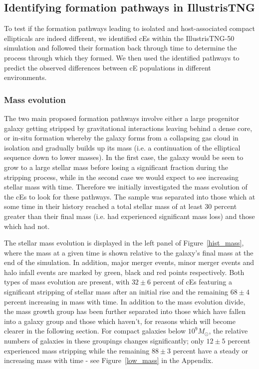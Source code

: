 \documentclass[a4paper,fleqn,usenatbib]{mnras}
\begin{document}
\subsection{Identifying formation pathways in IllustrisTNG}

To test if the formation pathways leading to isolated and host-associated compact ellipticals are indeed different, we identified cEs within the IllustrisTNG-50 simulation and followed their formation back through time to determine the process through which they formed. We then used the identified pathways to predict the observed differences between cE populations in different environments. 


\subsubsection{Mass evolution}

The two main proposed formation pathways involve either a large progenitor galaxy getting stripped by gravitational interactions leaving behind a dense core, or in-situ formation whereby the galaxy forms from a collapsing gas cloud in isolation and gradually builds up its mass (i.e. a continuation of the elliptical sequence down to lower masses). In the first case, the galaxy would be seen to grow to a large stellar mass before losing a significant fraction during the stripping process, while in the second case we would expect to see increasing stellar mass with time. Therefore we initially investigated the mass evolution of the cEs to look for these pathways. The sample was separated into those which at some time in their history reached a total stellar mass of at least 30 percent greater than their final mass (i.e. had experienced significant mass loss) and those which had not. 

The stellar mass evolution is displayed in the left panel of Figure~\ref{hist_mass}, where the mass at a given time is shown relative to the galaxy's final mass at the end of the simulation. In addition, major merger events, minor merger events and halo infall events are marked by green, black and red points respectively. Both types of mass evolution are present, with $32\pm6$ percent of cEs featuring a significant stripping of stellar mass after an initial rise and the remaining $68\pm4$ percent increasing in mass with time. In addition to the mass evolution divide, the mass growth group has been further separated into those which have fallen into a galaxy group and those which haven't, for reasons which will become clearer in the following section. For compact galaxies below $10^{9} M_{\odot}$, the relative numbers of galaxies in these groupings changes significantly; only $12\pm5$ percent experienced mass stripping while the remaining $88\pm3$ percent have a steady or increasing mass with time - see Figure~\ref{low_mass} in the Appendix.
\end{document}
